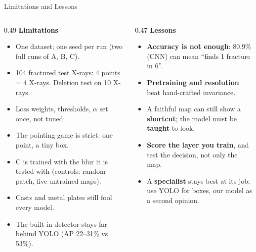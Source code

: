 \documentclass[aspectratio=169,10pt]{beamer}
\begin{document}
\begin{frame}{Limitations and Lessons}
  \begin{columns}[T]
    \begin{column}{0.49\textwidth}
      \textbf{Limitations}
      \begin{itemize}\small
        \item One dataset; one seed per run (two full runs of A, B, C).
        \item 104 fractured test X-rays: 4 points = 4 X-rays. Deletion test on 10 X-rays.
        \item Loss weights, thresholds, $\alpha$ set once, not tuned.
        \item The pointing game is strict: one point, a tiny box.
        \item C is trained with the blur it is tested with (controls: random patch, five untrained maps).
        \item Casts and metal plates still fool every model.
        \item The built-in detector stays far behind YOLO (AP 22--31\% vs 53\%).
      \end{itemize}
    \end{column}
    \begin{column}{0.47\textwidth}
      \textbf{Lessons}
      \begin{itemize}\small
        \item \textbf{Accuracy is not enough}: 80.9\% (CNN) can mean ``finds 1 fracture in 6''.
        \item \textbf{Pretraining and resolution} beat hand-crafted invariance.
        \item A faithful map can still show a \textbf{shortcut}; the model must be \textbf{taught} to look.
        \item \textbf{Score the layer you train}, and test the decision, not only the map.
        \item A \textbf{specialist} stays best at its job: use YOLO for boxes, our model as a second opinion.
      \end{itemize}
    \end{column}
  \end{columns}
\end{frame}
\end{document}
